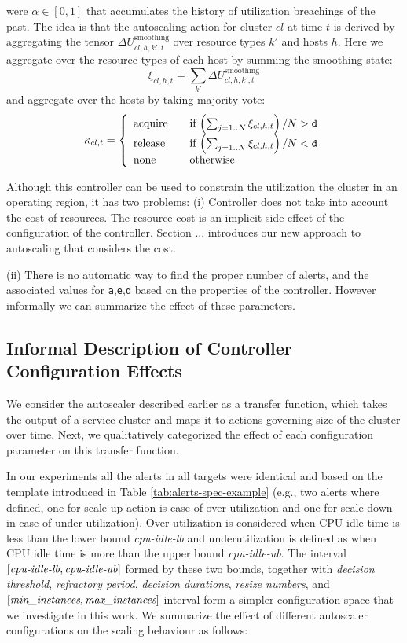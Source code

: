    were $\alpha\in[0,1]$  that accumulates the history of utilization breachings of the past.
 The idea is that the autoscaling action for cluster $cl$ at time $t$ is derived by aggregating the tensor $\Delta U^\text{smoothing}_{cl,h,k',t}$ over resource types $k'$  and hosts $h$. Here we aggregate over the resource types of each host by summing the smoothing state:   
\[
\xi_{cl,h,t}=\sum_{k'} \Delta U^\text{smoothing}_{cl,h,k',t} 
\]   
 and aggregate over the hosts  by taking  majority vote: %
\[
  \kappa_{cl,t} = \left\{    
  \begin{array}{l l}
    \text{acquire} & \quad \text{if $\left(\sum_{j=1..N} \xi_{cl,h,t}\right)/N > \mathtt{d}$}\\
    \text{release} & \quad \text{if $\left(\sum_{j=1..N} \xi_{cl,h,t}\right)/N < \mathtt{d}$}\\
    \text{none} & \quad \text{otherwise} 
  \end{array} \right. 
\]

Although this controller can be used to constrain the utilization the cluster in an operating region, it has two problems:  
 (i) Controller does not take into account the cost of resources. The resource cost is an implicit side effect of the configuration of the controller. Section ... introduces our new approach to autoscaling that considers the cost.  
 
  (ii) There is no automatic way to find the proper number of alerts, and the associated values for \texttt{a},\texttt{e},\texttt{d} based on the properties of the controller.  However informally we can summarize the effect of these parameters. 
    
   \subsection{Informal Description of Controller Configuration Effects}
We consider the autoscaler described earlier as a transfer function, which takes the output of a service cluster and maps it to actions governing size of the cluster over time.    
Next, we qualitatively categorized the effect of each configuration parameter on this transfer function.

In our experiments all the alerts in all targets were identical and based on the template introduced in Table \ref{tab:alerts-spec-example} (e.g., two alerts where defined, one for scale-up action is case of over-utilization and one for scale-down in case of under-utilization).
Over-utilization is considered when CPU idle time is less than the lower bound \textit{cpu-idle-lb} and underutilization is defined as when CPU idle time is more than the upper bound \textit{cpu-idle-ub}.
The interval $[\text{\textit{cpu-idle-lb}},\text{\textit{cpu-idle-ub}}]$ formed by these two bounds, together with {\it decision threshold}, {\it refractory period}, {\it decision durations}, {\it resize numbers}, and $[\text{{\it min\_instances}},\text{{\it max\_instances}}]$ interval form a simpler configuration space that we investigate in this work. 
We summarize the effect of different autoscaler configurations on the scaling behaviour as follows:

